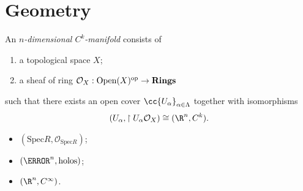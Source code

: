 \documentclass{article}
\begin{document}
\section{Geometry}

\begin{definition}
  An \emph{$n$-dimensional $C^k$-manifold} consists of
  \begin{enumerate}
    \item a topological space $X$;
    \item a sheaf of ring $\mathcal O_X:\operatorname{Open}(X)^{\text{op}}\to\textbf{Rings}$
  \end{enumerate}
  such that there exists an open cover $\cc{U_\alpha}_{\alpha\in\Lambda}$
  together with isomorphisms
  \begin{align*}
    (U_\alpha,\restriction{U_\alpha}{\mathcal O_X})\cong (\R^n,C^k).
  \end{align*}
\end{definition}

\begin{example}
  \begin{itemize}
    \item $(\text{Spec} R,\mathcal O_{\text{Spec} R})$;
    \item $(\C^n, \text{holos})$;
    \item $(\R^n, C^\infty)$.
  \end{itemize}
\end{example}

\printbibliography
\end{document}
